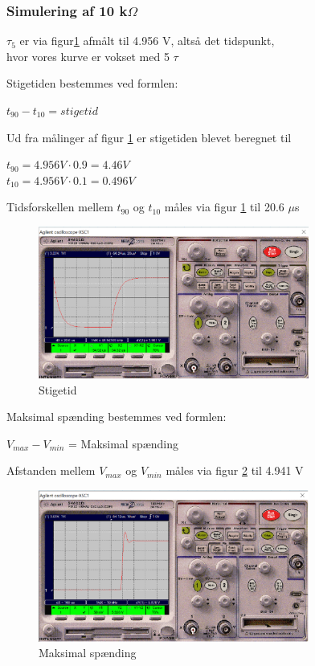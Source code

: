 \subsubsection{Simulering af 10 k$\Omega$ }
$\tau_5$ er via figur\ref{10k.stigetid} afmålt til 4.956 V, altså det tidspunkt, \\ hvor vores kurve er vokset med 5 $\tau$

Stigetiden bestemmes ved formlen:
\begin{center}
$t_{90} - t_{10} = stigetid$
\end{center}

Ud fra målinger af figur \ref{10k.stigetid} er stigetiden blevet beregnet til

\begin{center}
$t_{90} = 4.956 V \cdot 0.9 = 4.46 V$
\\ 
$t_{10} = 4.956 V \cdot 0.1 = 0.496 V$
\end{center}

Tidsforskellen mellem $t_{90}$ og $t_{10}$ måles via figur \ref{10k.stigetid} til 20.6 $\mu$s
\begin{figure}[h]
 \begin{center}
  \includegraphics[height=5cm]{P_Fig/figur10_10k_stigetid}
  \caption{Stigetid}
  \label{10k.stigetid}
 \end{center}
\end{figure}

Maksimal spænding bestemmes ved formlen:
\begin{center}
$V_{max} - V_{min}$ = Maksimal spænding
\end{center}

Afstanden mellem $V_{max}$ og $V_{min}$ måles via figur \ref{10k_max} til 4.941 V

\begin{figure}[h]
 \begin{center}
  \includegraphics[height=5cm]{P_Fig/figur9_1k_max}
  \caption{Maksimal spænding}
  \label{10k_max}
 \end{center}
\end{figure}